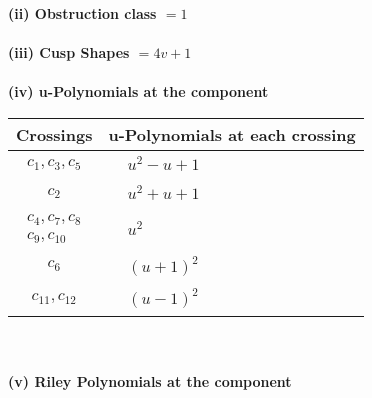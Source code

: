 \documentclass[1p]{elsarticle_modified}
\theoremstyle{definition}
\begin{document}
\flushleft \textbf{(ii) Obstruction class $= 1$}\\~\\
\flushleft \textbf{(iii) Cusp Shapes $= 4 v+1$}\\~\\
\newpage\renewcommand{\arraystretch}{1}
\flushleft \textbf{(iv) u-Polynomials at the component}\newline \\
\begin{tabular}{m{50pt}|m{274pt}}
Crossings & \hspace{64pt}u-Polynomials at each crossing \\
\hline $$\begin{aligned}c_{1},c_{3},c_{5}\end{aligned}$$&$\begin{aligned}
&u^2- u+1
\end{aligned}$\\
\hline $$\begin{aligned}c_{2}\end{aligned}$$&$\begin{aligned}
&u^2+u+1
\end{aligned}$\\
\hline $$\begin{aligned}c_{4},c_{7},c_{8}\\c_{9},c_{10}\end{aligned}$$&$\begin{aligned}
&u^2
\end{aligned}$\\
\hline $$\begin{aligned}c_{6}\end{aligned}$$&$\begin{aligned}
&(u+1)^2
\end{aligned}$\\
\hline $$\begin{aligned}c_{11},c_{12}\end{aligned}$$&$\begin{aligned}
&(u-1)^2
\end{aligned}$\\
\hline
\end{tabular}\\~\\
\newpage\renewcommand{\arraystretch}{1}
\flushleft \textbf{(v) Riley Polynomials at the component}\newline \\
\end{document}
